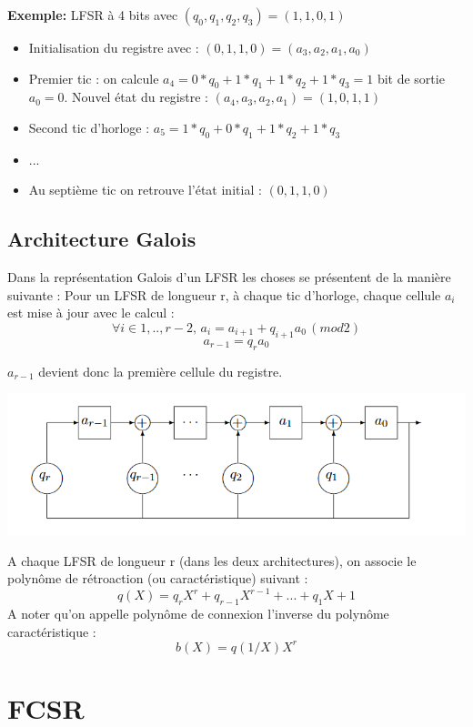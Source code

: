 \documentclass[11pt]{report}
\begin{document}
	\textbf{Exemple:} LFSR à 4 bits avec $(q_0,q_1,q_2,q_3)=(1,1,0,1)$ 
	\begin{itemize}
	\item Initialisation du registre avec : $(0,1,1,0)=(a_3,a_2,a_1,a_0)$
	\item Premier tic : on calcule $a_4=0*q_0+1*q_1+1*q_2+1*q_3 = 1$ bit de sortie $a_0 = 0$. Nouvel état du registre : $(a_4,a_3,a_2,a_1)=(1,0,1,1)$
	\item Second tic d'horloge : $a_5=1*q_0+0*q_1+1*q_2+1*q_3$
	\item ...
	\item Au septième tic on retrouve l'état initial : $(0,1,1,0)$
	\end{itemize}
	
	
	
	
	\section{Architecture Galois}
	
	Dans la représentation Galois d'un LFSR les choses se présentent de la manière suivante : 
	Pour un LFSR de longueur r, à chaque tic d'horloge, chaque cellule $a_i$ est mise à jour avec le calcul : 
	\[
	\forall i \in {1,..,r-2}, 
	\,a_i = a_{i+1} + q_{i+1}a_0 \,(mod 2)\]
	\[ a_{r-1} = q_ra_0
	\]
	
	$a_{r-1}$ devient donc la première cellule du registre. 
	\\
	\begin{center}
	\includegraphics{GaloisLFSR.png}
	\label{LFSRGalois}
	\end{center}
	
	A chaque LFSR de longueur r (dans les deux architectures), on associe le polynôme de rétroaction (ou caractéristique) suivant : 
	\[
		q(X) = q_rX^r + q_{r-1}X^{r-1} + ... + q_1X + 1
	\]	
	A noter qu'on appelle polynôme de connexion l'inverse du polynôme caractéristique : 
	\[
		b(X) = q(1/X)X^r
	\]
	
	
\chapter{FCSR}
\end{document}

